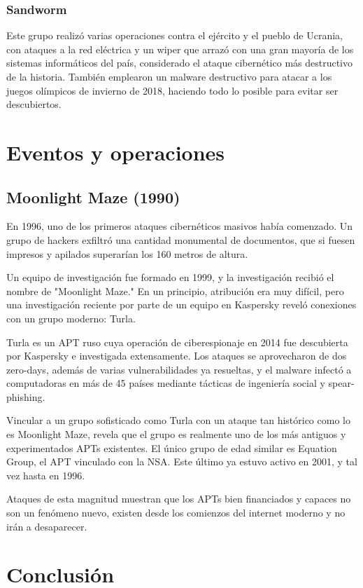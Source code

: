 \documentclass{article}
\begin{document}
\subsubsection{Sandworm}
Este grupo realizó varias operaciones contra el ejército y el pueblo de Ucrania, con ataques a la red eléctrica y un wiper que arrazó con una gran mayoría de los sistemas informáticos del país, considerado el ataque cibernético más destructivo de la historia. También emplearon un malware destructivo para atacar a los juegos olímpicos de invierno de 2018, haciendo todo lo posible para evitar ser descubiertos.


\section{Eventos y operaciones}

\subsection{Moonlight Maze (1990)}
En 1996, uno de los primeros ataques cibernéticos masivos había comenzado. Un grupo de hackers exfiltró una cantidad monumental de documentos, que si fuesen impresos y apilados superarían los 160 metros de altura.

Un equipo de investigación fue formado en 1999, y la investigación recibió el nombre de "Moonlight Maze." En un principio, atribución era muy difícil, pero una investigación reciente por parte de un equipo en Kaspersky reveló conexiones con un grupo moderno: Turla.

Turla es un APT ruso cuya operación de ciberespionaje en 2014 fue descubierta por Kaspersky e investigada extensamente. Los ataques se aprovecharon de dos zero-days, además de varias vulnerabilidades ya resueltas, y el malware infectó a computadoras en más de 45 países mediante tácticas de ingeniería social y spear-phishing.

Vincular a un grupo sofisticado como Turla con un ataque tan histórico como lo es Moonlight Maze, revela que el grupo es realmente uno de los más antiguos y experimentados APTs existentes. El único grupo de edad similar es Equation Group, el APT vinculado con la NSA. Este último ya estuvo activo en 2001, y tal vez hasta en 1996.

Ataques de esta magnitud muestran que los APTs bien financiados y capaces no son un fenómeno nuevo, existen desde los comienzos del internet moderno y no irán a desaparecer.

\section{Conclusión}
\end{document}
